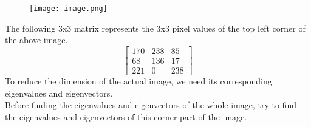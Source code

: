 \documentclass{book}
\begin{document}
\begin{figure}[h!]
	\centering
		\texttt{[image: image.png]}
\end{figure}
The following 3x3 matrix represents the 3x3 pixel values of the top left corner of the above image.
\begin{equation*}
	\begin{bmatrix}
		170 & 238 & 85\\
		68 & 136 & 17\\
		221 & 0 & 238
	\end{bmatrix}
\end{equation*}
To reduce the dimension of the actual image, we need its corresponding eigenvalues and eigenvectors. \\
Before finding the eigenvalues and eigenvectors of the whole image, try to find the eigenvalues and eigenvectors of this corner part of the image.
\end{document}
